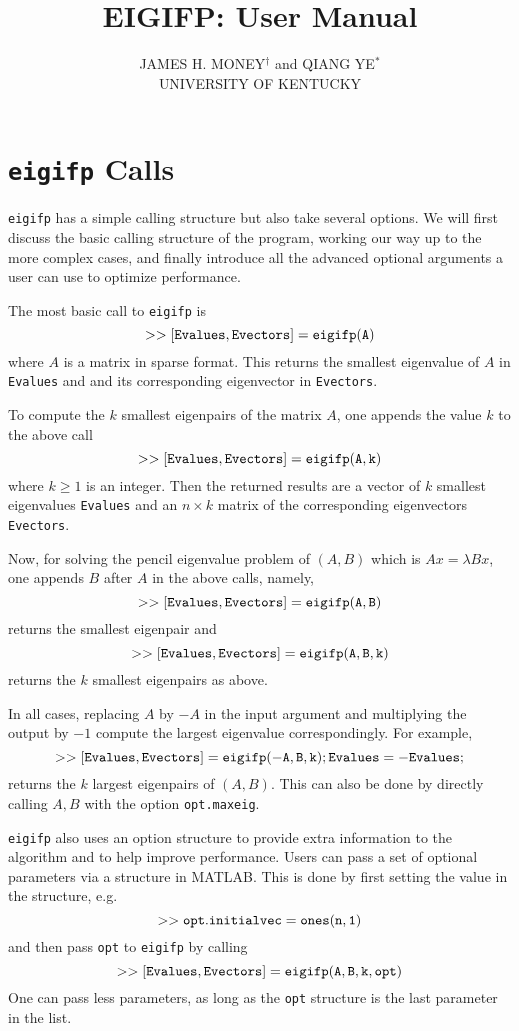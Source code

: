 \documentclass[acmtoms]{acmtrans2m}
\title{EIGIFP: User Manual}
\author{    JAMES H. MONEY$^\dagger$ and QIANG YE$^*$\\
        UNIVERSITY OF KENTUCKY
}
\begin{document}
\maketitle

\newcommand{\eigifp}{{\tt eigifp}  }
\section{\eigifp Calls}
\newcommand{\Or}{{\cal O}}

\eigifp has a simple calling structure but also take  several options. 
We will first discuss the basic calling structure
of the program, working our way up to the more complex cases, and finally introduce all
the advanced optional arguments a user can use to optimize performance.


The most basic call to \eigifp is
\[
 {\tt >>[Evalues,Evectors]=eigifp(A)}
\]
where $A$ is a matrix in sparse format. This returns 
the smallest eigenvalue of $A$ in 
{\tt Evalues}  and and its corresponding eigenvector in {\tt Evectors}.

To compute
the $k$ smallest eigenpairs of the matrix $A$, one appends 
the value $k$ to the above call 
\[
 {\tt >>[Evalues,Evectors]=eigifp(A,k)}
\]
where $k\geq 1$ is an integer. Then the returned results are 
a vector of $k$ smallest eigenvalues {\tt Evalues} and
an $n \times k$ matrix of the corresponding eigenvectors {\tt Evectors}.

Now, for solving the pencil eigenvalue problem of $(A,B)$ which is
$Ax= \lambda B x$, one appends 
$B$ after $A$ in the above calls, namely,   
\[
 {\tt >>[Evalues,Evectors]=eigifp(A,B)}
\]
returns the smallest eigenpair and 
\[
 {\tt >>[Evalues,Evectors]=eigifp(A,B,k) }
\]
returns the $k$ smallest eigenpairs as above. 

In all cases, replacing $A$ by $-A$ in the input argument and multiplying  
the output by $-1$ compute the largest eigenvalue correspondingly. 
For example, 
\[
 {\tt >>[Evalues,Evectors]= eigifp(-A,B,k);  Evalues = - Evalues;}
\]
returns the $k$ largest eigenpairs of $(A,B)$. This can also be done by 
directly calling $A,B$ with the option {\tt opt.maxeig}. 


\eigifp also uses an option structure to provide   
extra information to the algorithm and
to help improve performance. Users can pass  a set of optional parameters via a structure in MATLAB. This is done by first setting the value in the structure, e.g. 
\[
{\tt >>opt.initialvec=ones(n,1)}
\]
and then pass {\tt opt} to  \eigifp by calling 
\[
 {\tt >>[Evalues,Evectors]=eigifp(A,B,k,opt)}
\]
One can pass less parameters, as long as the {\tt opt} structure 
is the last 
parameter in the list.
\end{document}
